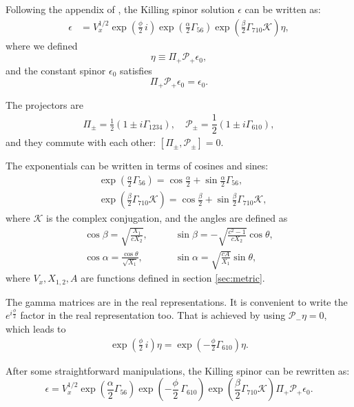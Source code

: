 
Following the appendix of \cite{Chen-Lin:2015xlh}, the Killing spinor solution $\epsilon$ can be written as:
\begin{align}
\epsilon &= V_x^{1/2} \exp{\left(\frac{\phi}{2}\, i \right)} \exp{\left(\frac{\alpha}{2}\Gamma_{56} \right)} \exp{\left(\frac{\beta}{2}\Gamma_{7 10} \mathcal{K} \right)} \eta,
\end{align}
where we defined
\begin{equation}
\eta \equiv \Pi_{+} \mathcal{P}_+ \epsilon_0,
\end{equation}
and the constant spinor $\epsilon_0$ satisfies
\begin{equation}
 \Pi_+ \mathcal{P}_+ \epsilon_0 = \epsilon_0.
\end{equation}

The projectors are
\begin{align}\label{eq:projectors}
\Pi_\pm = 
\frac{1}{2}\left(1 \pm i\Gamma_{1234}\right), 
\quad
\mathcal{P}_{\pm} =
\dfrac{1}{2} \left(1\pm i\Gamma_{6 10}\right),
\end{align}
and they commute with each other: $[\Pi_\pm, \mathcal{P}_{\pm}]=0$. 


The exponentials can be written in terms of cosines and sines:
\begin{align}
&\exp{\left(\frac{\alpha}{2}\Gamma_{56} \right)} = \cos\frac{\alpha}{2} + \sin\frac{\alpha}{2}\Gamma_{5 6},\\
&\exp{\left(\frac{\beta}{2}\Gamma_{7 10} \mathcal{K} \right)} = \cos\frac{\beta}{2} + \sin\frac{\beta}{2}\Gamma_{7 10}\mathcal{K},
\end{align}
where $\mathcal{K}$ is the complex conjugation, and the angles are defined as
\begin{align}
\cos\beta = \sqrt{\frac{X_1}{c X_2}}, \quad 
&\quad
\sin\beta = -\sqrt{\frac{c^2 - 1}{c X_2}}\cos\theta,\\
%
\cos\alpha = \frac{\cos\theta}{\sqrt{X_1}}, 
&\quad
\sin\alpha = \sqrt{\frac{c A}{X_1}}\sin\theta,
\end{align}
where $V_x, X_{1,2}, A$ are functions defined in section \ref{sec:metric}.


The gamma matrices are in the real representations. It is convenient to write the $e^{i \frac{\phi}{2}}$ factor in the real representation too. 
That is achieved by using $\mathcal{P}_- \eta = 0 $, which leads to
\begin{align}
 \exp{\left(\frac{\phi}{2}\, i \right)} \eta 
    = \exp{\left(-\frac{\phi}{2}\Gamma_{6 10} \right)} \eta. 
\end{align}

After some straightforward manipulations, the Killing spinor can be rewritten as:
\begin{equation}\label{eq:KillingSpinor}
\epsilon =  V_x^{1/2} \exp{\left(\frac{\alpha}{2}\Gamma_{56} \right)} \exp{\left(-\frac{\phi}{2}\, \Gamma_{6 10} \right)} \exp{\left(\frac{\beta}{2}\Gamma_{7 10} \mathcal{K} \right)} \Pi_{+} \mathcal{P}_+ \epsilon_0.
\end{equation}

